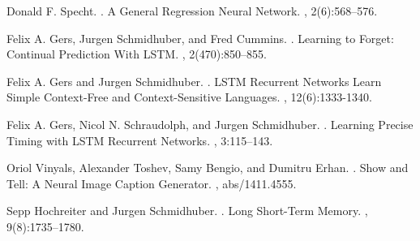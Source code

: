\documentclass[11pt,letterpaper]{article}
\begin{document}
\begin{thebibliography}{}

Donald F. Specht.
.
\newblock A General Regression Neural Network.
,
2(6):568--576.

Felix A. Gers,  Jurgen Schmidhuber, and Fred Cummins.
.
\newblock Learning to Forget: Continual Prediction With LSTM.
,
2(470):850--855.

Felix A. Gers and Jurgen Schmidhuber.
.
\newblock LSTM Recurrent Networks Learn Simple Context-Free and Context-Sensitive Languages.
,
12(6):1333-1340.

Felix A. Gers, Nicol N. Schraudolph, and Jurgen Schmidhuber.
.
\newblock Learning Precise Timing with LSTM Recurrent Networks.
,
3:115--143.

Oriol Vinyals, Alexander Toshev, Samy Bengio, and Dumitru Erhan.
.
\newblock Show and Tell: A Neural Image Caption Generator.
,
abs/1411.4555.

Sepp Hochreiter and Jurgen Schmidhuber.
.
\newblock Long Short-Term Memory.
,
9(8):1735--1780.

\end{thebibliography}
\end{document}
